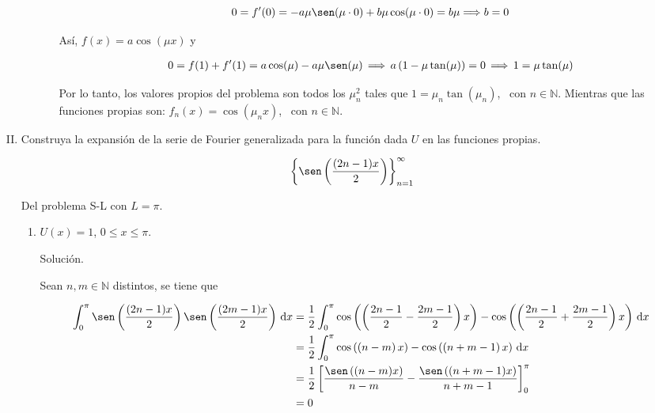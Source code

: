 \documentclass[fleqn]{article}
\newcommand{\nat}{\mathbb{N}}
\newcommand{\integ}[3]{\displaystyle \int_{#1}^{#2} #3 \, \mathrm{d} x}
\begin{document}
\begin{enumerate}[I.]
\begin{enumerate}
\begin{enumerate}[i)]
				\begin{equation*}
					0 = f'(0) = -a \mu \sen(\mu \cdot 0) + b \mu \cos(\mu \cdot 0) = b \mu \Longrightarrow b = 0
				\end{equation*}

				Así, $ f(x) = a \cos(\mu x) $ y 

				\begin{align*}
					0 = f(1) + f'(1) = a \cos(\mu) - a \mu \sen(\mu) \, \Longrightarrow \, a \left( 1 - \mu \tan(\mu) \right) = 0 \, \Longrightarrow \, 1 = \mu \tan (\mu)
				\end{align*}
				
				Por lo tanto, los valores propios del problema son todos los $ \mu_n^2 $ tales que $ 1 = \mu_n \tan (\mu_n) $, \, con $ n \in \nat $. Mientras que las funciones propias son: $ f_n (x) = \cos(\mu_n x) $, \, con $ n \in \nat $.
			\end{enumerate}
			
		\end{enumerate}

		
		\bfseries
			
		\item Construya la expansión de la serie de Fourier generalizada para la función dada $U$ en las funciones propias.
		
		\begin{equation*}
			\left\lbrace \sen \left( \dfrac{(2n - 1) x}{2} \right) \right\rbrace_{n=1}^{\infty}
		\end{equation*}

		Del problema S-L con $ L = \pi $.
		
		\begin{enumerate}
			\item $ U(x) = 1 $, $ 0 \leq x \leq \pi $.
			
			Solución.
			
			\normalfont

            Sean $ n, m \in \nat $ distintos, se tiene que

            \begin{align*}
                \integ{0}{\pi}{\sen \left( \dfrac{(2n - 1) x}{2} \right) \sen \left( \dfrac{(2m - 1) x}{2} \right)} &= \dfrac{1}{2}\integ{0}{\pi}{ \cos \left( \left( \dfrac{2n - 1}{2} - \dfrac{2m - 1}{2} \right) x \right) - \cos \left( \left(\dfrac{2n - 1}{2} + \dfrac{2m - 1}{2} \right) x \right) } \\
                &= \dfrac{1}{2} \integ{0}{\pi}{ \cos \left( \left( n - m \right) x \right) - \cos \left( \left( n + m - 1 \right) x \right) } \\
                &= \dfrac{1}{2} \left[ \dfrac{\sen \left( (n - m) x \right)}{n - m} - \dfrac{\sen \left( (n + m - 1) x \right)}{n +m -1} \right]_{0}^{\pi} \\
                &= 0
            \end{align*}


\end{enumerate}
\end{enumerate}
\end{document}
